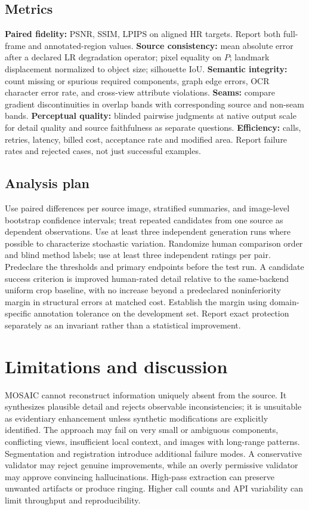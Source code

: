 \documentclass[10pt,twocolumn]{article}
\begin{document}
\subsection{Metrics}
\textbf{Paired fidelity:} PSNR, SSIM, LPIPS \cite{lpips} on aligned HR targets. Report both full-frame and annotated-region values. \textbf{Source consistency:} mean absolute error after a declared LR degradation operator; pixel equality on $P$; landmark displacement normalized to object size; silhouette IoU. \textbf{Semantic integrity:} count missing or spurious required components, graph edge errors, OCR character error rate, and cross-view attribute violations. \textbf{Seams:} compare gradient discontinuities in overlap bands with corresponding source and non-seam bands. \textbf{Perceptual quality:} blinded pairwise judgments at native output scale for detail quality and source faithfulness as separate questions. \textbf{Efficiency:} calls, retries, latency, billed cost, acceptance rate and modified area. Report failure rates and rejected cases, not just successful examples.

\subsection{Analysis plan}
Use paired differences per source image, stratified summaries, and image-level bootstrap confidence intervals; treat repeated candidates from one source as dependent observations. Use at least three independent generation runs where possible to characterize stochastic variation. Randomize human comparison order and blind method labels; use at least three independent ratings per pair. Predeclare the thresholds and primary endpoints before the test run. A candidate success criterion is improved human-rated detail relative to the same-backend uniform crop baseline, with no increase beyond a predeclared noninferiority margin in structural errors at matched cost. Establish the margin using domain-specific annotation tolerance on the development set. Report exact protection separately as an invariant rather than a statistical improvement.

\section{Limitations and discussion}
MOSAIC cannot reconstruct information uniquely absent from the source. It synthesizes plausible detail and rejects observable inconsistencies; it is unsuitable as evidentiary enhancement unless synthetic modifications are explicitly identified. The approach may fail on very small or ambiguous components, conflicting views, insufficient local context, and images with long-range patterns. Segmentation and registration introduce additional failure modes. A conservative validator may reject genuine improvements, while an overly permissive validator may approve convincing hallucinations. High-pass extraction can preserve unwanted artifacts or produce ringing. Higher call counts and API variability can limit throughput and reproducibility.
\end{document}

